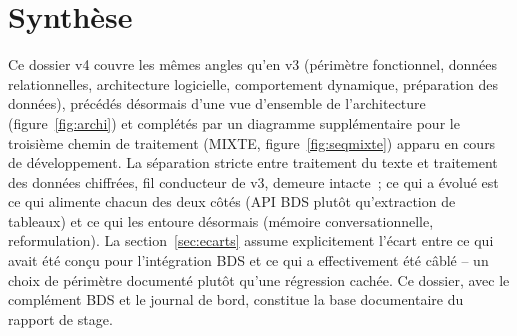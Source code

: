 \documentclass[11pt,a4paper]{article}
\begin{document}
\section{Synth\`ese}
Ce dossier v4 couvre les m\^emes angles qu'en v3 (p\'erim\`etre fonctionnel, donn\'ees relationnelles, architecture logicielle, comportement dynamique, pr\'eparation des donn\'ees), pr\'ec\'ed\'es d\'esormais d'une vue d'ensemble de l'architecture (figure~\ref{fig:archi}) et compl\'et\'es par un diagramme suppl\'ementaire pour le troisi\`eme chemin de traitement (MIXTE, figure~\ref{fig:seqmixte}) apparu en cours de d\'eveloppement. La s\'eparation stricte entre traitement du texte et traitement des donn\'ees chiffr\'ees, fil conducteur de v3, demeure intacte~; ce qui a \'evolu\'e est ce qui alimente chacun des deux c\^ot\'es (API BDS plut\^ot qu'extraction de tableaux) et ce qui les entoure d\'esormais (m\'emoire conversationnelle, reformulation). La section~\ref{sec:ecarts} assume explicitement l'\'ecart entre ce qui avait \'et\'e con\c{c}u pour l'int\'egration BDS et ce qui a effectivement \'et\'e c\^abl\'e -- un choix de p\'erim\`etre document\'e plut\^ot qu'une r\'egression cach\'ee. Ce dossier, avec le compl\'ement BDS et le journal de bord, constitue la base documentaire du rapport de stage.
\end{document}
